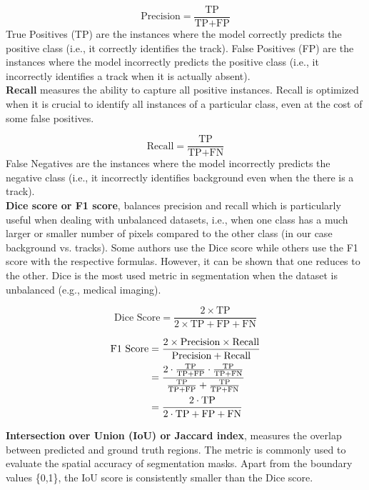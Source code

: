 \documentclass[Master,MDS,english]{BASE/twbook} %
\begin{document}
\[
\text{Precision} = \frac{\text{TP}}{\text{TP} + \text{FP}}
\]
True Positives (TP) are the instances where the model correctly predicts the positive class (i.e., it correctly identifies the track).
False Positives (FP) are the instances where the model incorrectly predicts the positive class (i.e., it incorrectly identifies a track when it is actually absent). \\


\noindent\textbf{Recall} measures the ability to capture all positive instances. Recall is optimized when it is crucial to identify all instances of a particular class, even at the cost of some false positives.

\[
\text{Recall} = \frac{\text{TP}}{\text{TP} + \text{FN}}
\]
False Negatives are the instances where the model incorrectly predicts the negative class (i.e., it incorrectly identifies background even when the there is a track). \\

\noindent\textbf{Dice score or F1 score}, balances precision and recall which is particularly useful when dealing with unbalanced datasets, i.e., when one class has a much larger or smaller number of pixels compared to the other class (in our case background vs. tracks). Some authors use the Dice score while others use the F1 score with the respective formulas. However, it can be shown that one reduces to the other. Dice is the most used metric in segmentation when the dataset is unbalanced (e.g., medical imaging). 


\[
\text{Dice Score} = \frac{2 \times \text{TP}}{2 \times \text{TP} + \text{FP} + \text{FN}}
\]

\begin{align*}
    \text{F1 Score} &= \frac{2 \times \text{Precision} \times \text{Recall}}{\text{Precision} + \text{Recall}} \\
    \vspace{1em}
     &= \frac{2 \cdot \frac{\text{TP}}{\text{TP} + \text{FP}} \cdot \frac{\text{TP}}{\text{TP} + \text{FN}}}{\frac{\text{TP}}{\text{TP} + \text{FP}} + \frac{\text{TP}}{\text{TP} + \text{FN}}} \\
    \vspace{1em}
     &= \frac{2 \cdot \text{TP}}{2 \cdot \text{TP} + \text{FP} + \text{FN}}
\end{align*}

\noindent\textbf{Intersection over Union (IoU) or Jaccard index}, measures the overlap between predicted and ground truth regions. The metric is commonly used to evaluate the spatial accuracy of segmentation masks. Apart from the boundary values \{0,1\}, the IoU score is consistently smaller than the Dice score.
\end{document}
